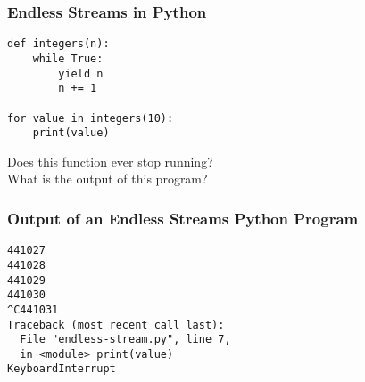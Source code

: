 \documentclass[14pt,aspectratio=169]{beamer}
\begin{document}
%
\begin{frame}[fragile]
  \frametitle{Endless Streams in Python}
  \normalsize
  \begin{minipage}{6in}
    \vspace*{.1in}
    \begin{verbatim}
def integers(n):
    while True:
        yield n
        n += 1

for value in integers(10):
    print(value)
    \end{verbatim}
  \end{minipage}
  \vspace*{.05in}
  \begin{center}
    \normalsize \noindent Does this function ever stop running? \\
    \normalsize \noindent What is the output of this program? \\
  \end{center}
\end{frame}

%
\begin{frame}[fragile]
  \frametitle{Output of an Endless Streams Python Program}
  \normalsize
  \begin{minipage}{6in}
    \vspace*{.1in}
    \begin{verbatim}
441027
441028
441029
441030
^C441031
Traceback (most recent call last):
  File "endless-stream.py", line 7,
  in <module> print(value)
KeyboardInterrupt
    \end{verbatim}
  \end{minipage}
\end{frame}
\end{document}
